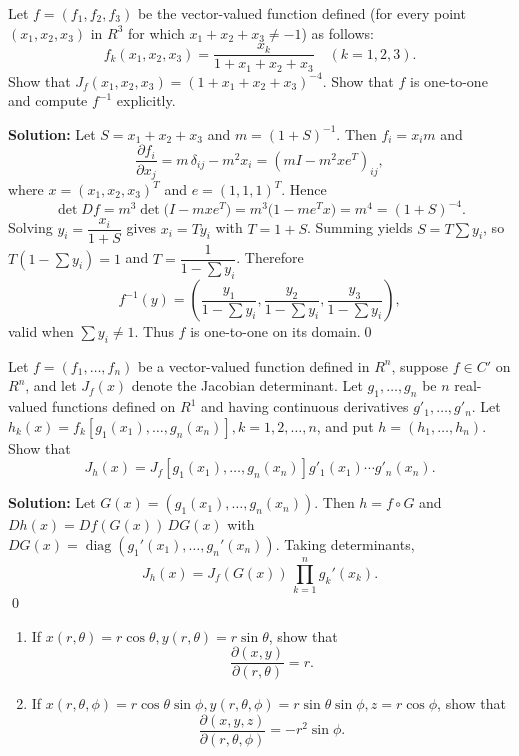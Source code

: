 \begin{problembox}
Let \( f = (f_1, f_2, f_3) \) be the vector-valued function defined (for every point \( (x_1, x_2, x_3) \) in \( R^3 \) for which \( x_1 + x_2 + x_3 \neq -1 \)) as follows:
\[f_k(x_1, x_2, x_3) = \frac{x_k}{1 + x_1 + x_2 + x_3} \quad (k = 1, 2, 3).\]
Show that \( J_f(x_1, x_2, x_3) = (1 + x_1 + x_2 + x_3)^{-4} \). Show that \( f \) is one-to-one and compute \( f^{-1} \) explicitly.
\end{problembox}

\noindent\textbf{Solution:}
Let $S=x_1+x_2+x_3$ and $m=(1+S)^{-1}$. Then $f_i=x_im$ and
\[\frac{\partial f_i}{\partial x_j}=m\,\delta_{ij}-m^2 x_i=(mI-m^2xe^{\!T})_{ij},\]
where $x=(x_1,x_2,x_3)^{\!T}$ and $e=(1,1,1)^{\!T}$. Hence
\[\det Df=m^3\det\big(I-mxe^{\!T}\big)=m^3\big(1-me^{\!T}x\big)=m^4=(1+S)^{-4}.
\]
Solving $y_i=\dfrac{x_i}{1+S}$ gives $x_i=Ty_i$ with $T=1+S$. Summing yields $S=T\sum y_i$, so $T(1-\sum y_i)=1$ and $T=\dfrac{1}{1-\sum y_i}$. Therefore
\[f^{-1}(y)=\left(\frac{y_1}{1-\sum y_i},\frac{y_2}{1-\sum y_i},\frac{y_3}{1-\sum y_i}\right),\]
valid when $\sum y_i\neq 1$. Thus $f$ is one-to-one on its domain.\qed


\begin{problembox}
Let \( f = (f_1, \ldots, f_n) \) be a vector-valued function defined in \( R^n \), suppose \( f \in C' \) on \( R^n \), and let \( J_f(x) \) denote the Jacobian determinant. Let \( g_1, \ldots, g_n \) be \( n \) real-valued functions defined on \( R^1 \) and having continuous derivatives \( g'_1, \ldots, g'_n \). Let \( h_k(x) = f_k[g_1(x_1), \ldots, g_n(x_n)], k = 1, 2, \ldots, n \), and put \( h = (h_1, \ldots, h_n) \). Show that
\[J_h(x) = J_f[g_1(x_1), \ldots, g_n(x_n)]g'_1(x_1) \cdots g'_n(x_n).\]
\end{problembox}

\noindent\textbf{Solution:}
Let $G(x)=(g_1(x_1),\dots,g_n(x_n))$. Then $h=f\circ G$ and $Dh(x)=Df(G(x))\,DG(x)$ with $DG(x)=\operatorname{diag}(g_1'(x_1),\dots,g_n'(x_n))$. Taking determinants,
\[J_h(x)=J_f(G(x))\,\prod_{k=1}^n g_k'(x_k).
\]\qed


\begin{problembox}
\begin{enumerate}[label=(\alph*)]
    \item If \( x(r, \theta) = r \cos \theta, y(r, \theta) = r \sin \theta \), show that
    \[\frac{\partial (x, y)}{\partial (r, \theta)} = r.\]
    \item If \( x(r, \theta, \phi) = r \cos \theta \sin \phi, y(r, \theta, \phi) = r \sin \theta \sin \phi, z = r \cos \phi \), show that
    \[\frac{\partial (x, y, z)}{\partial (r, \theta, \phi)} = -r^2 \sin \phi.\]
\end{enumerate}
\end{problembox}

